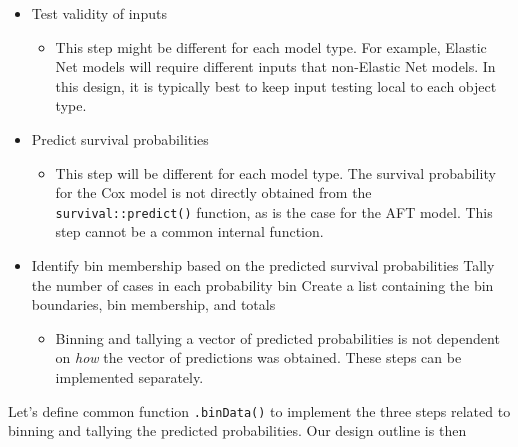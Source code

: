 \documentclass[
]{book}
\providecommand{\tightlist}{%
  \setlength{\itemsep}{0pt}\setlength{\parskip}{0pt}}
\begin{document}
\begin{itemize}
\tightlist
\item
  Test validity of inputs

  \begin{itemize}
  \tightlist
  \item
    This step might be different for each model type. For example, Elastic Net models will require different inputs that non-Elastic Net models. In this design, it is typically best to keep input testing local to each object type.
  \end{itemize}
\item
  Predict survival probabilities

  \begin{itemize}
  \tightlist
  \item
    This step will be different for each model type. The survival probability for the Cox model is not directly obtained from the \texttt{survival::predict()} function, as is the case for the AFT model. This step cannot be a common internal function.
  \end{itemize}
\item
  Identify bin membership based on the predicted survival probabilities
  Tally the number of cases in each probability bin
  Create a list containing the bin boundaries, bin membership, and totals

  \begin{itemize}
  \tightlist
  \item
    Binning and tallying a vector of predicted probabilities is not dependent on \emph{how} the vector of predictions was obtained. These steps can be implemented separately.
  \end{itemize}
\end{itemize}

Let's define common function \texttt{.binData()} to implement the three steps related to binning and tallying the predicted probabilities. Our design outline is then
\end{document}
